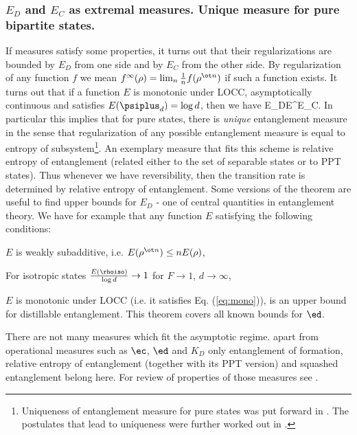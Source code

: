 \documentclass[rmp,12pt,preprint]{revtex4-2}
\begin{document}
\subsubsection{$E_D$ and $E_C$ as extremal measures. Unique measure
for pure bipartite states.}
\label{subsubsec:extremal} If measures satisfy some properties, it
turns out that their regularizations are bounded by $E_D$ from one
side and by $E_C$ from the other side. By regularization of any
function $f$ we mean $f^{\infty}(\rho)=\lim_n {1\over n} f(\rho^{\ot
n})$ if such a function exists. It turns out that if a function $E$
is monotonic under LOCC, asymptotically continuous and satisfies
$E(\psiplus_d)=\log d$, then we have
\be
E_D\leq  E^\infty  \leq E_C.
\ee
In particular this implies that for pure states, there is {\it unique}
entanglement measure in the sense that regularization of any
possible entanglement measure is equal to entropy of
subsystem\footnote{Uniqueness of entanglement measure for pure states
was put forward in \cite{popescu-rohrlich}. The postulates that
lead to uniqueness were further worked out in \cite{Vidal-mon2000,limits,DonaldHR2001}.}. An
exemplary measure that fits this scheme is relative entropy of
entanglement (related either to the set of separable states or to PPT
states). Thus whenever we have reversibility, then the transition
rate is determined by relative entropy of entanglement. Some
versions of the theorem are useful to find upper bounds for $E_D$ -
one of central quantities in entanglement theory. We have for
example that any function $E$ satisfying the following conditions:
\bee
\item $E$ is weakly subadditive, i.e. $E(\rho^{\ot n})\leq nE(\rho)$,
\item For isotropic states ${E(\rhoiso)\over \log d} \to 1$
for $F\to 1$, $d\to \infty$,
\item $E$ is monotonic under LOCC (i.e. it satisfies Eq. (\ref{eq:mono})),
\eee
is an upper bound for distillable entanglement. This theorem
covers all known bounds for $\ed$.


There are not many measures which fit the asymptotic regime. apart
from operational measures such as $\ec$, $\ed$ and $K_D$ only
entanglement of formation, relative entropy of entanglement
(together with its PPT version) and squashed entanglement belong
here. For review of properties of those measures see
\cite{Christandl-PhD}.
\end{document}
